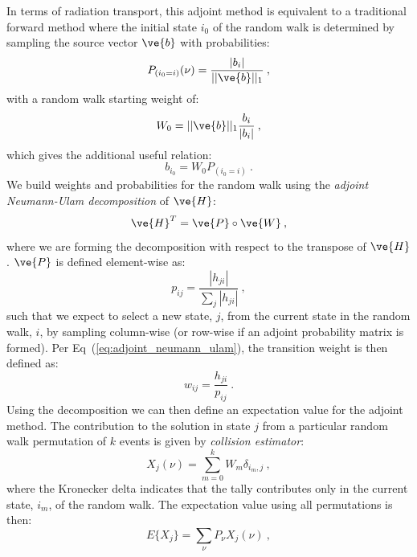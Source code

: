 \documentclass[letterpaper,11pt]{article}
\begin{document}
In terms of radiation transport, this adjoint method is equivalent to
a traditional forward method where the initial state $i_0$ of the
random walk is determined by sampling the source vector $\ve{b}$ with
probabilities:
\begin{equation}
  P_{(i_0=i)}(\nu) = \frac{|b_i|}{||\ve{b}||_1}\:,
  \label{eq:adjoint_source_probability}
\end{equation}
with a random walk starting weight of:
\begin{equation}
  W_0 = ||\ve{b}||_1 \frac{b_i}{|b_i|}\:,
  \label{eq:adjoint_starting_weight}
\end{equation}
which gives the additional useful relation:
\begin{equation}
  b_{i_0} = W_0 P_{(i_0=i)}\:.
  \label{eq:adjoint_source_definition}
\end{equation}
We build weights and probabilities for the random walk using the
\textit{adjoint Neumann-Ulam decomposition} of $\ve{H}$:
\begin{equation}
  \ve{H}^{T} = \ve{P} \circ \ve{W}\:,
  \label{eq:adjoint_neumann_ulam}
\end{equation}
where we are forming the decomposition with respect to the transpose
of $\ve{H}$. $\ve{P}$ is defined element-wise as:
\begin{equation}
  p_{ij} = \frac{|h_{ji}|}{\sum_j |h_{ji}|}\:,
  \label{eq:adjoint_probability}
\end{equation}
such that we expect to select a new state, $j$, from the current state
in the random walk, $i$, by sampling column-wise (or row-wise if an
adjoint probability matrix is formed). Per
Eq~(\ref{eq:adjoint_neumann_ulam}), the transition weight is then
defined as:
\begin{equation}
  w_{ij} = \frac{h_{ji}}{p_{ij}}\:.
  \label{eq:adjoint_weight}
\end{equation}
Using the decomposition we can then define an expectation value for
the adjoint method. The contribution to the solution in state $j$ from
a particular random walk permutation of $k$ events is given by
\textit{collision estimator}:
\begin{equation}
  X_{j}(\nu) = \sum_{m=0}^k W_{m} \delta_{i_m,j}\:,
  \label{eq:adjoint_permutation_contribution}
\end{equation}
where the Kronecker delta indicates that the tally contributes only in
the current state, $i_m$, of the random walk. The expectation value
using all permutations is then:
\begin{equation}
  E\{X_j\} = \sum_{\nu} P_{\nu} X_{j}(\nu)\:,
  \label{eq:adjoint_expectation_value}
\end{equation}
\end{document}
